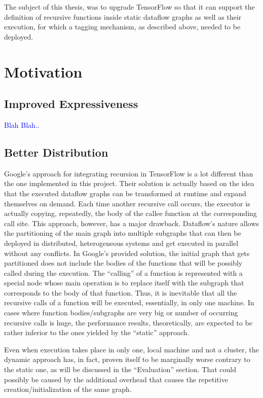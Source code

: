 \documentclass[ack,preface]{dithesis}
\begin{document}
The subject of this thesis, was to upgrade TensorFlow so that it can support the definition of recursive functions inside static dataflow graphs as well as their execution, for which a tagging mechanism, as described above, needed to be deployed.


    \section{Motivation}

    \subsection{Improved Expressiveness}
	 \textcolor{blue}{Blah Blah..}

    \subsection{Better Distribution}
	Google’s approach for integrating recursion in TensorFlow is a lot different than the one implemented in this project. Their solution is actually based on the idea that the executed dataflow graphs can be transformed at runtime and expand themselves on demand. Each time another recursive call occurs, the executor is actually copying, repeatedly, the body of the callee function at the corresponding call site. This approach, however, has a major drawback. Dataflow’s nature allows the partitioning of the main graph into multiple subgraphs that can then be deployed in distributed, heterogeneous systems and get executed in parallel without any conflicts. In Google’s provided solution, the initial graph that gets partitioned does not include the bodies of the functions that will be possibly called during the execution. The “calling” of a function is represented with a special node whose main operation is to replace itself with the subgraph that corresponds to the body of that function. Thus, it is inevitable that all the recursive calls of a function will be executed, essentially, in only one machine.  In cases where function bodies/subgraphs are very big or number of occurring recursive calls is huge, the performance results, theoretically, are expected to be rather inferior to the ones yielded by the “static” approach.

Even when execution takes place in only one, local machine and not a cluster, the dynamic approach has, in fact, proven itself to be marginally worse contrary to the static one, as will be discussed in the “Evaluation” section. That could possibly be caused by the additional overhead that causes the repetitive creation/initialization of the same graph.
\end{document}
